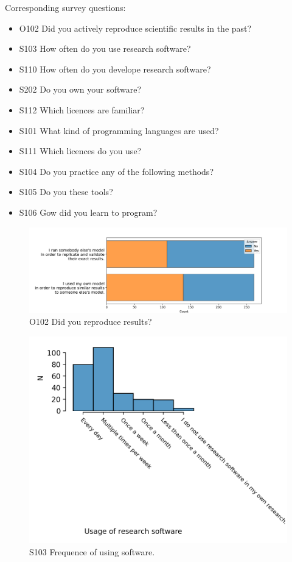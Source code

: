 \documentclass{article}
\begin{document}
Corresponding survey questions:
\begin{itemize}
	\item O102 Did you actively reproduce scientific results in the past?
	\item S103 How often do you use research software?
	\item S110 How often do you develope research software?
	\item S202 Do you own your software?
	\item S112 Which licences are familiar?
	\item S101 What kind of programming languages are used?
	\item S111 Which licences do you use?
	\item S104 Do you practice any of the following methods?
	\item S105 Do you these tools?
	\item S106 Gow did you learn to program?
\end{itemize}

\begin{figure}[!p]
    \centering
    \includegraphics[width=\textwidth]{../figs/O102.png}
	\caption{O102 Did you reproduce results?}
    \label{fig:O102}
\end{figure}

\begin{figure}[!p]
    \centering
    \includegraphics[width=\textwidth]{../figs/S103.png}
	\caption{S103 Frequence of using software.}
    \label{fig:S103}
\end{figure}
\end{document}
